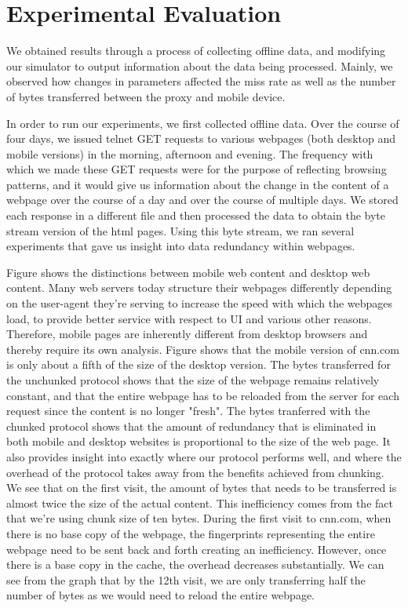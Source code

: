 \section{Experimental Evaluation}
\label{sec:eval}

We obtained results through a process of collecting offline data, and modifying our simulator to output information about the data being processed. 
Mainly, we observed how changes in parameters affected the miss rate as well as the number of bytes transferred between the proxy and mobile device.

In order to run our experiments, we first collected offline data. 
Over the course of four days, we issued telnet GET requests to various webpages (both desktop and mobile versions) in the morning, afternoon and evening. 
The frequency with which we made these GET requests were for the purpose of reflecting browsing patterns, and it would give us information about the change in the content of a webpage over the course of a day and over the course of multiple days. 
We stored each response in a different file and then processed the data to obtain the byte stream version of the html pages. 
Using this byte stream, we ran several experiments that gave us insight into data redundancy within webpages.

Figure shows the distinctions between mobile web content and desktop web content. 
Many web servers today structure their webpages differently depending on the user-agent they're serving to increase the speed with which the webpages load, to provide better service with respect to UI and various other reasons. 
Therefore, mobile pages are inherently different from desktop browsers and thereby require its own analysis. 
Figure shows that the mobile version of cnn.com is only about a fifth of the size of the desktop version. 
The bytes transferred for the unchunked protocol shows that the size of the webpage remains relatively constant, and that the entire webpage has to be reloaded from the server for each request since the content is no longer "fresh". 
The bytes tranferred with the chunked protocol shows that the amount of redundancy that is eliminated in both mobile and desktop websites is proportional to the size of the web page. 
It also provides insight into exactly where our protocol performs well, and where the overhead of the protocol takes away from the benefits achieved from chunking. 
We see that on the first visit, the amount of bytes that needs to be transferred is almost twice the size of the actual content. 
This inefficiency comes from the fact that we're using chunk size of ten bytes. 
During the first visit to cnn.com, when there is no base copy of the webpage, the fingerprints representing the entire webpage need to be sent back and forth creating an inefficiency. 
However, once there is a base copy in the cache, the overhead decreases substantially. 
We can see from the graph that by the 12th visit, we are only transferring half the number of bytes as we would need to reload the entire webpage. 

